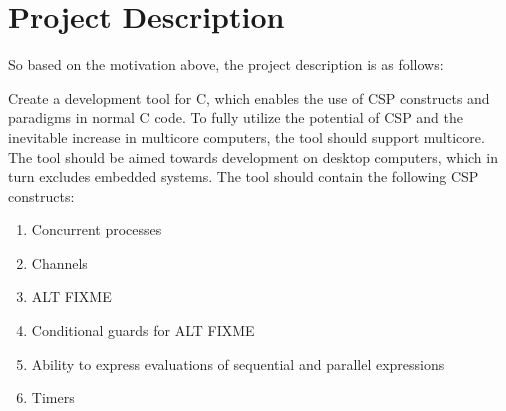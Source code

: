 \section{Project Description}
\label{sec:project_description}

So based on the motivation above, the project description is as follows:

Create a development tool for C, which enables the use of CSP constructs and paradigms in normal C code. To fully utilize the potential of CSP and the inevitable increase in multicore computers, the tool should support multicore. The tool should be aimed towards development on desktop computers, which in turn excludes embedded systems. The tool should contain the following CSP constructs:

\begin{enumerate}
    \item Concurrent processes
    \item Channels
    \item ALT FIXME
    \item Conditional guards for ALT FIXME
    \item Ability to express evaluations of sequential and parallel expressions
    \item Timers
\end{enumerate}

